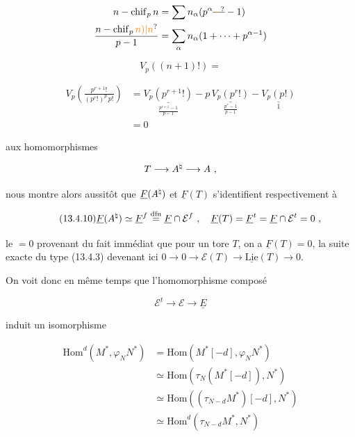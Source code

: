 \[
\begin{aligned}
n-\mathrm{chif}_p\,n&=\sum n_\alpha(p^\alpha\deleted{\unsure{-}}-1)\\
\frac{n-\mathrm{chif}_p\,\unsure{n)|n}}{p-1}&=\sum_\alpha n_\alpha(1+\cdots+p^{\alpha-1})
\end{aligned}
\]

\[
V_p((n+1)!)=
\]

\[
\begin{aligned}
V_p\left(\frac{p^{r+1}!}{(p^r!)^p\,p!}\right)
&=\underset{\frac{p^{r+1}-1}{p-1}}{\underline{V_p(p^{r+1}!)}}-p\,\underset{\frac{p^r-1}{p-1}}{\underline{V_p(p^r!)}}-\underset{1}{\underline{V_p(p!)}}\\
&=0
\end{aligned}
\]


aux homomorphismes

\[
T\longrightarrow A^{\natural}\longrightarrow A\ ,
\]

nous montre alors aussitôt que $\underline{F}(A^{\natural})$ et $\underline{F}(T)$ s'identifient respectivement à

\[
\tag*{(13.4.10)}
\underline{F}(A^{\handwritten{\natural}})\simeq\underline{F}^{f}\overset{\mathrm{dfn}}{=}\underline{F}\cap\mathcal{E}^{f}\ ,\quad \underline{F}(T)=\underline{F}^{t}=\underline{F}\cap\mathcal{E}^{t}=0\ ,
\]

le $=0$ provenant du fait immédiat que pour un tore $T$, on a $\underline{F}(T)=0$, la suite exacte du type (13.4.3) devenant ici $0\to0\to\mathcal{E}(T)\to\underline{\mathrm{Lie}}(T)\to0$.

On voit donc en même temps que l'homomorphisme composé

\[
\mathcal{E}^{t}\longrightarrow\mathcal{E}\longrightarrow\underline{E}
\]

induit un isomorphisme




\[
\begin{aligned}
\mathrm{Hom}^{d}(M^{*},\varphi_N N^{*})&=\mathrm{Hom}(M^{*}[-d],\varphi_N N^{*})\\
&\simeq\mathrm{Hom}(\tau_N(M^{*}[-d]),N^{*})\\
&\simeq\mathrm{Hom}((\tau_{N-d}M^{*})[-d],N^{*})\\
&\simeq\mathrm{Hom}^{d}(\tau_{N-d}M^{*},N^{*})
\end{aligned}
\]

